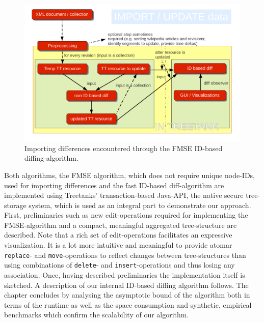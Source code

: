\begin{figure}[tb]
\centering
\includegraphics[width=\textwidth]{figures/importdata}
\caption{Importing differences encountered through the FMSE ID-based diffing-algorithm.} 
\label{fig:importdata}
\end{figure}

Both algorithms, the FMSE algorithm, which does not require unique node-IDs, used for importing differences and the fast ID-based diff-algorithm are implemented using Treetanks' transaction-based Java-API, the native secure tree-storage system, which is used as an integral part to demonstrate our approach. First, preliminaries such as new edit-operations required for implementing the FMSE-algorithm and a compact, meaningful aggregated tree-structure are described. Note that a rich set of edit-operations facilitates an expressive visualization. It is a lot more intuitive and meaningful to provide atomar \texttt{replace}- and \texttt{move}-operations to reflect changes between tree-structures than using combinations of \texttt{delete}- and \texttt{insert}-operations and thus losing any association. Once, having described preliminaries the implementation itself is sketched. A description of our internal ID-based diffing algorithm follows. The chapter concludes by analysing the asymptotic bound of the algorithm both in terms of the runtime as well as the space consumption and synthetic, empirical benchmarks which confirm the scalability of our algorithm.


